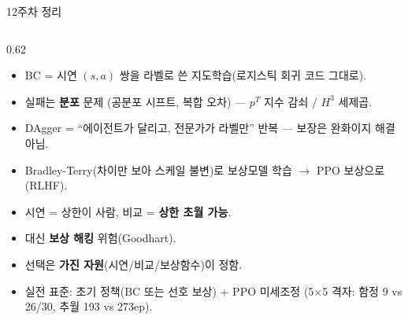 \begin{frame}{12주차 정리}
  \small
  \begin{columns}[T]
    \begin{column}{0.62\textwidth}
      \begin{itemize}
        \item BC = 시연 $(s,a)$ 쌍을 라벨로 쓴 지도학습(로지스틱
          회귀 코드 그대로).
        \item 실패는 \textbf{분포} 문제 (공분포 시프트, 복합 오차) —
          $p^T$ 지수 감쇠 / $H^3$ 세제곱.
        \item DAgger = ``에이전트가 달리고, 전문가가 라벨만'' 반복 —
          보장은 완화이지 해결 아님.
      \end{itemize}
      \begin{itemize}
        \item Bradley-Terry(차이만 보아 스케일 불변)로 보상모델
          학습 $\to$ PPO 보상으로(RLHF).
        \item 시연 = 상한이 사람, 비교 = \textbf{상한 초월 가능}.
        \item 대신 \textbf{보상 해킹} 위험(Goodhart).
      \end{itemize}
      \begin{itemize}
        \item 선택은 \textbf{가진 자원}(시연/비교/보상함수)이
          정함.
        \item 실전 표준: 초기 정책(BC 또는 선호 보상) + PPO
          미세조정 (5$\times$5 격자: 함정 9 vs 26/30, 추월
          193 vs 273ep).
      \end{itemize}
    \end{column}
  \end{columns}
\end{frame}
